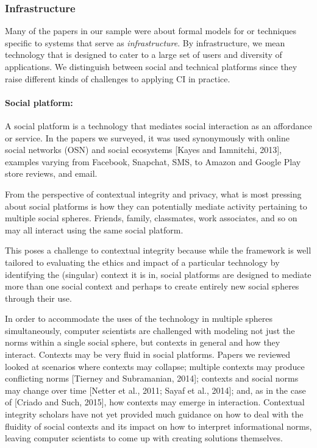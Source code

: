 \documentclass[../thesis.tex]{subfiles}
\begin{document}
\subsubsection{Infrastructure}
\label{CI4.1.2}
  
Many of the papers in our sample were about formal models for or
techniques specific to systems that serve as \textit{infrastructure}.
By infrastructure, we mean technology that is designed to cater to a
large set of users and diversity of applications. We distinguish
between social and technical platforms since they raise different kinds
of challenges to applying CI in practice.

\paragraph{Social platform:} A social platform is a technology that
mediates social interaction as an affordance or service. In the papers
we surveyed, it was used synonymously with online social networks (OSN)
and social ecosystems [Kayes and Iamnitchi, 2013], examples varying
from Facebook, Snapchat, SMS, to Amazon and Google Play store reviews,
and email.

From the perspective of contextual integrity and privacy, what is most
pressing about social platforms is how they can potentially mediate
activity pertaining to multiple social spheres. Friends, family,
classmates, work associates, and so on may all interact using the same
social platform.

This poses a challenge to contextual integrity because while the
framework is well tailored to evaluating the ethics and impact of a
particular technology by identifying the (singular) context it is in,
social platforms are designed to mediate more than one social context
and perhaps to create entirely new social spheres through their use.

In order to accommodate the uses of the technology in multiple spheres
simultaneously, computer scientists are challenged with modeling not
just the norms within a single social sphere, but contexts in general
and how they interact. Contexts may be very fluid in social platforms.
Papers we reviewed looked at scenarios where contexts may collapse;
multiple contexts may produce conflicting norms [Tierney and
Subramanian, 2014]; contexts and social norms may change over time
[Netter et al., 2011; Sayaf et al., 2014]; and, as in the case of
[Criado and Such, 2015], how contexts may emerge in interaction.
Contextual integrity scholars have not yet provided much guidance on
how to deal with the fluidity of social contexts and its impact on how
to interpret informational norms, leaving computer scientists to come
up with creating solutions themselves.
\end{document}
